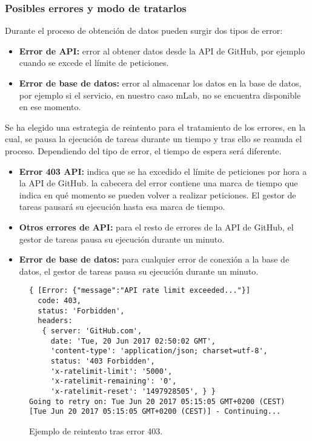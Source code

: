 
\subsubsection{Posibles errores y modo de tratarlos}

Durante el proceso de obtención de datos pueden surgir dos tipos de error:

\begin{itemize}
\tightlist
	\item \textbf{Error de API:} error al obtener datos desde la API de GitHub, por ejemplo cuando se excede el límite de peticiones.
	\item \textbf{Error de base de datos:} error al almacenar los datos en la base de datos, por ejemplo si el servicio, en nuestro caso mLab, no se encuentra disponible en ese momento.
\end{itemize}


Se ha elegido una estrategia de reintento para el tratamiento de los errores, en la cual, se pausa la ejecución de tareas durante un tiempo y tras ello se reanuda el proceso. Dependiendo del tipo de error, el tiempo de espera será diferente.

\begin{itemize}
\tightlist
	\item \textbf{Error 403 API:} indica que se ha excedido el límite de peticiones por hora a la API de GitHub. la cabecera del error contiene una marca de tiempo que indica en qué momento se pueden volver a realizar peticiones. El gestor de tareas pausará su ejecución hasta esa marca de tiempo.
	\item \textbf{Otros errores de API:} para el resto de errores de la API de GitHub, el gestor de tareas pausa su ejecución durante un minuto.
	\item \textbf{Error de base de datos:} para cualquier error de conexión a la base de datos, el gestor de tareas pausa su ejecución durante un minuto.
\end{itemize}

\begin{figure}[H]
\begin{verbatim}
{ [Error: {"message":"API rate limit exceeded..."}]
  code: 403,
  status: 'Forbidden',
  headers: 
   { server: 'GitHub.com',
     date: 'Tue, 20 Jun 2017 02:50:02 GMT',
     'content-type': 'application/json; charset=utf-8',
     status: '403 Forbidden',
     'x-ratelimit-limit': '5000',
     'x-ratelimit-remaining': '0',
     'x-ratelimit-reset': '1497928505', } }
Going to retry on: Tue Jun 20 2017 05:15:05 GMT+0200 (CEST)
[Tue Jun 20 2017 05:15:05 GMT+0200 (CEST)] - Continuing...
\end{verbatim}
\caption{Ejemplo de reintento tras error 403.} 
\label{reintento-error-403}
\end{figure}


